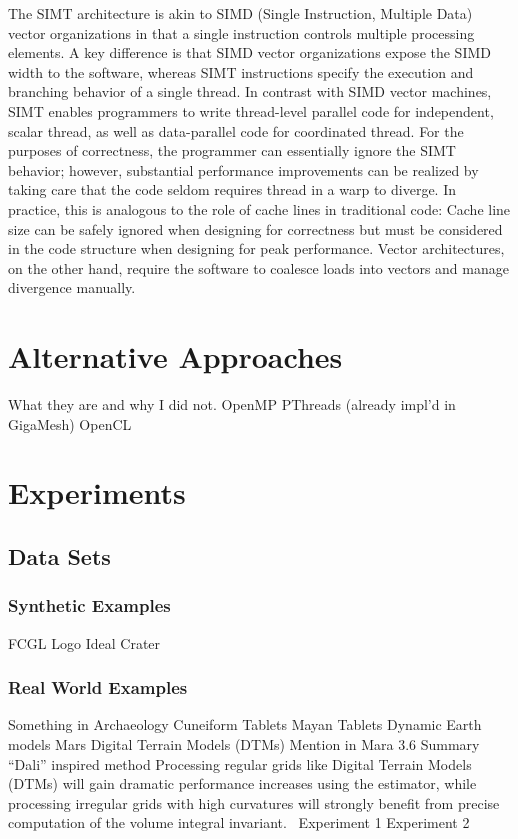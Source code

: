 \documentclass{article}
\begin{document}
The SIMT architecture is akin to SIMD (Single Instruction, Multiple Data) vector organizations in that a single instruction controls multiple processing elements. A key difference is that SIMD vector organizations expose the SIMD width to the software, whereas SIMT instructions specify the execution and branching behavior of a single thread. In contrast with SIMD vector machines, SIMT enables programmers to write thread-level parallel code for independent, scalar thread, as well as data-parallel code for coordinated thread. For the purposes of correctness, the programmer can essentially ignore the SIMT behavior; however, substantial performance improvements can be realized by taking care that the code seldom requires thread in a warp to diverge. In practice, this is analogous to the role of cache lines in traditional code: Cache line size can be safely ignored when designing for correctness but must be considered in the code structure when designing for peak performance. Vector architectures, on the other hand, require the software to coalesce loads into vectors and manage divergence manually.
\section{Alternative Approaches}
	What they are
and why I did not.
OpenMP
PThreads
(already impl’d in GigaMesh)
OpenCL
\section{Experiments}
\subsection{Data Sets}
\subsubsection{Synthetic Examples}
	FCGL Logo
	Ideal Crater
\subsubsection{Real World Examples}
Something in Archaeology
Cuneiform Tablets
Mayan Tablets
Dynamic Earth models
Mars
Digital Terrain Models (DTMs) Mention in Mara 3.6 Summary “Dali” inspired method
Processing regular grids like Digital Terrain Models (DTMs) will gain dramatic performance increases using the estimator, while processing irregular grids with high curvatures will strongly benefit from precise computation of the volume integral invariant.~\cite[p.~143]{Mara12}
Experiment 1
Experiment 2
\end{document}
